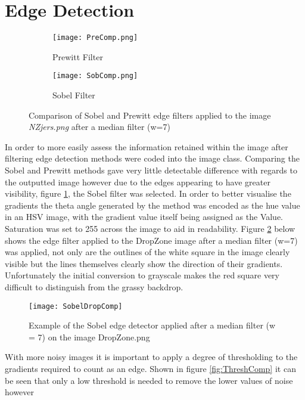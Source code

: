 \documentclass{article}
\begin{document}
\section{Edge Detection}


\begin{figure}[h]
\begin{subfigure}{.5\textwidth}
	\centering
	\texttt{[image: PreComp.png]}
	\caption{Prewitt Filter}	
\end{subfigure}
\hfill
\begin{subfigure}{.5\textwidth}
	\centering
	\texttt{[image: SobComp.png]}
	\caption{Sobel Filter}	
\end{subfigure}
\caption{Comparison of Sobel and Prewitt edge filters applied to the image \textit{NZjers.png} after a median filter (w=7)}
\label{fig:EdgeCompare}
\end{figure}

In order to more easily assess the information retained within the image after filtering edge detection methods were coded into the image class. Comparing the Sobel and Prewitt methods gave very little detectable difference with regards to the outputted image however due to the edges appearing to have greater visibility, figure \ref{fig:EdgeCompare}, the Sobel filter was selected. In order to better visualise the gradients the theta angle generated by the method was encoded as the hue value in an HSV image, with the gradient value itself being assigned as the Value. Saturation was set to 255 across the image to aid in readability. Figure \ref{fig:SobDrop} below shows the edge filter applied to the DropZone image after a median filter (w=7) was applied, not only are the outlines of the white square in the image clearly visible but the lines themselves clearly show the direction of their gradients. Unfortunately the initial conversion to grayscale makes the red square very difficult to distinguish from the grassy backdrop.
\begin{figure}[h!]
	\centering
	\texttt{[image: SobelDropComp]}
	\caption{Example of the Sobel edge detector applied after a median filter (w = 7) on the image DropZone.png}
	\label{fig:SobDrop}
\end{figure}

With more noisy images it is important to apply a degree of thresholding to the gradients required to count as an edge. Shown in figure \ref{fig:ThreshComp} it can be seen that only a low threshold is needed to remove the lower values of noise however
\end{document}
